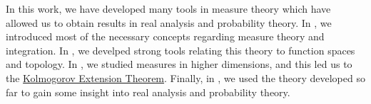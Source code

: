 In this work, we have developed many tools in measure theory which have allowed us to obtain results in real analysis and probability theory. In , we introduced most of the necessary concepts regarding measure theory and integration. In , we develped strong tools relating this theory to function spaces and topology. In , we studied measures in higher dimensions, and this led us to the \hyperref[theorem:Kolmogorov Extension]{Kolmogorov Extension Theorem}. Finally, in , we used the theory developed so far to gain some insight into real analysis and probability theory.
